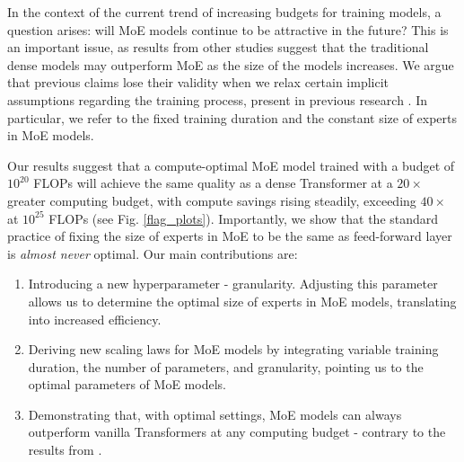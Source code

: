 In the context of the current trend of increasing budgets for training models, a question arises: will MoE models continue to be attractive in the future? This is an important issue, as results from other studies \citep{clark2022unified} suggest that the traditional dense models may outperform MoE as the size of the models increases. We argue that previous claims lose their validity when we relax certain implicit assumptions regarding the training process, present in previous research \citep{clark2022unified}. In particular, we refer to the fixed training duration and the constant size of experts in MoE models. 

Our results suggest that a compute-optimal MoE model trained with a budget of $10^{20}$ FLOPs will achieve the same quality as a dense Transformer at a \textit{$20\times$} greater computing budget, with compute savings rising steadily, exceeding \textit{$40\times$} at $10^{25}$ FLOPs (see Fig. \ref{flag_plots}). Importantly, we show that the standard practice of fixing the size of experts in MoE to be the same as feed-forward layer is \textit{almost never} optimal. Our main contributions are:
\begin{enumerate}
    \item Introducing a new hyperparameter - granularity. Adjusting this parameter allows us to determine the optimal size of experts in MoE models, translating into increased efficiency.

    \item Deriving new scaling laws for MoE models by integrating variable training duration, the number of parameters, and granularity, pointing us to the optimal parameters of MoE models.

    \item Demonstrating that, with optimal settings, MoE models can always outperform vanilla Transformers at any computing budget - contrary to the results from \cite{clark2022unified}.
\end{enumerate}
